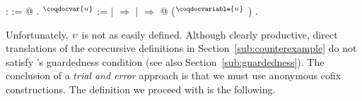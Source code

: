 \begin{singlespace}
\begin{coqdoccode}
\coqdocnoindent
{}
:  :=
 @
.\coqdoceol
\coqdocemptyline
\coqdocnoindent
{}
$^\coqdocvar{n}$
 :=\coqdoceol
\coqdocindent{1.00em}
  \coqdoceol
\coqdocindent{1.00em}
\ensuremath{|}
\ensuremath{\Rightarrow} \coqdoceol
\coqdocindent{1.00em}
\ensuremath{|}
 \ensuremath{\Rightarrow}
 @
($^\coqdocvariable{n}$
)\coqdoceol
\coqdocindent{1.00em}
.\coqdoceol
\end{coqdoccode}
\end{singlespace}
Unfortunately, $\upsilon$ is not as easily defined. Although clearly
productive, direct translations of the corecursive definitions in
Section~\ref{sub:counterexample} do not satisfy \Coq's guardedness
condition (see also Section~\ref{sub:guardedness}). The conclusion of
a \emph{trial and error} approach is that we must use anonymous cofix
constructions. The definition we proceed with is the following.
